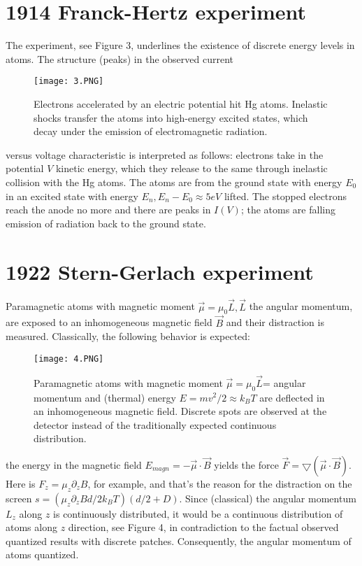 \section{1914 Franck-Hertz experiment}
The experiment, see Figure  3, underlines the existence of discrete energy levels in atoms. The structure (peaks) in the observed current
\begin{figure}[ht]
    \centering
    \texttt{[image: 3.PNG]}
    \caption{Electrons accelerated by an electric potential hit Hg atoms. Inelastic shocks transfer the atoms into high-energy excited states, which decay under the emission of electromagnetic radiation.}
    \label{fig:3}
\end{figure}
versus voltage characteristic is interpreted as follows: electrons take in the potential $V$ kinetic energy, which they release to the same through inelastic collision with the Hg atoms. The atoms are from the ground state with energy $E_0$ in an excited state with energy $E_n, E_n - E_0 \approx 5 eV$ lifted. The stopped electrons reach the anode no more and there are peaks in $I (V)$; the atoms are falling emission of radiation back to the ground state.

\section{1922 Stern-Gerlach experiment}
Paramagnetic atoms with magnetic moment $\vec{\mu} = \mu_0 \vec{L}, \vec{L}$ the angular momentum, are exposed to an inhomogeneous magnetic field $\vec{B}$ and their distraction is measured. Classically, the following behavior is expected:
\begin{figure}[ht]
    \centering
    \texttt{[image: 4.PNG]}
    \caption{Paramagnetic atoms with magnetic moment $\vec{\mu}=\mu_0 \vec{L}$= angular momentum and (thermal) energy $E = mv^2/2 \approx k_BT$ are deflected in an inhomogeneous magnetic field. Discrete spots are observed at the detector instead of the traditionally expected continuous distribution.}
    \label{fig:4}
\end{figure}
the energy in the magnetic field $E_{magn}=-\vec{\mu}\cdot \vec{B}$ yields the force $\vec{F}=\bigtriangledown(\vec{\mu}\cdot\vec{B})$. Here is $F_z=\mu_z\partial_zB$, for example, and that's the reason for the distraction on the screen
$s=(\mu_z\partial_zBd/2k_BT)(d/2+D)$. Since (classical) the angular momentum $L_z$ along $z$ is continuously distributed, it would be a continuous distribution of
atoms along $z$ direction, see Figure  4, in contradiction to the factual observed quantized results with discrete patches. Consequently, the angular momentum of atoms quantized.

